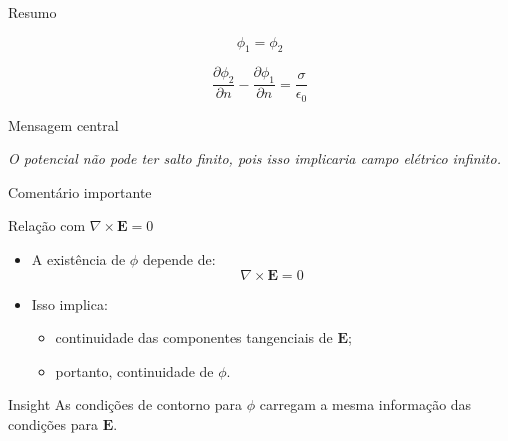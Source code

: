 \documentclass[aspectratio=169,11pt]{beamer}
\begin{document}
\begin{frame}{Resumo}
\begin{tcolorbox}[colback=black!5,colframe=black!80,title=Conclusão matemática]

\begin{equation}
\phi_1 = \phi_2
\end{equation}

\begin{equation}
\frac{\partial \phi_2}{\partial n}
-
\frac{\partial \phi_1}{\partial n}
=
\frac{\sigma}{\epsilon_0}
\end{equation}

\end{tcolorbox}

\pause

\begin{block}{Mensagem central}
\begin{center}
\textit{O potencial não pode ter salto finito, pois isso implicaria campo elétrico infinito.}
\end{center}
\end{block}

\end{frame}


\begin{frame}{Comentário importante}
\begin{block}{Relação com $\nabla \times \mathbf{E} = 0$}
\begin{itemize}
\item A existência de $\phi$ depende de:
\begin{equation}
\nabla \times \mathbf{E} = 0
\end{equation}

\item Isso implica:
\begin{itemize}
\item continuidade das componentes tangenciais de $\mathbf{E}$;
\item portanto, continuidade de $\phi$.
\end{itemize}
\end{itemize}
\end{block}

\pause

\begin{alertblock}{Insight}
As condições de contorno para $\phi$ carregam a mesma informação das condições para $\mathbf{E}$.
\end{alertblock}

\end{frame}
\end{document}
